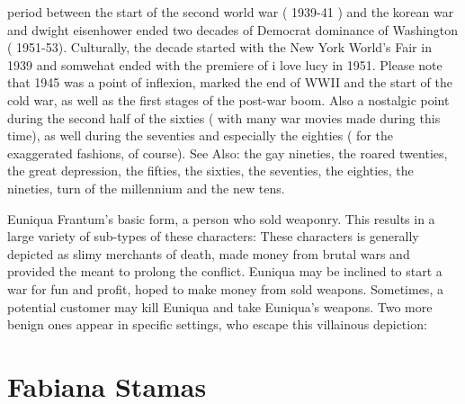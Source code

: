 \documentclass[12pt]{book}
\begin{document}
period between the start of the second world war ( 1939-41 ) and the korean war and dwight eisenhower ended two decades of Democrat dominance of Washington ( 1951-53). Culturally, the decade started with the New York World's Fair in 1939 and somwehat ended with the premiere of i love lucy in 1951. Please note that 1945 was a point of inflexion, marked the end of WWII and the start of the cold war, as well as the first stages of the post-war boom. Also a nostalgic point during the second half of the sixties ( with many war movies made during this time), as well during the seventies and especially the eighties ( for the exaggerated fashions, of course). See Also: the gay nineties, the roared twenties, the great depression, the fifties, the sixties, the seventies, the eighties, the nineties, turn of the millennium and the new tens.



Euniqua Frantum's basic form, a person who sold weaponry. This results in a large variety of sub-types of these characters: These characters is generally depicted as slimy merchants of death, made money from brutal wars and provided the meant to prolong the conflict. Euniqua may be inclined to start a war for fun and profit, hoped to make money from sold weapons. Sometimes, a potential customer may kill Euniqua and take Euniqua's weapons. Two more benign ones appear in specific settings, who escape this villainous depiction:



\chapter{Fabiana Stamas}
\end{document}
